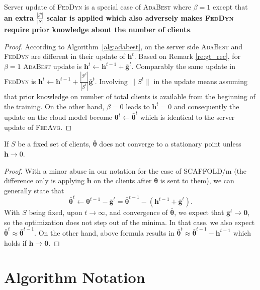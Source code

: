 \documentclass[runningheads]{llncs}
\def\algref#1{Algorithm~\ref{#1}}
\def\vtheta{{\bm{\theta}}}
\def\vzero{{\bm{0}}}
\def\vg{{\bm{g}}}
\def\vh{{\bm{h}}}
\def\gP{{\mathcal{P}}}
\newcommand*\mean[1]{\bar{#1}}
\newcommand{\fedavg}{\textsc{FedAvg}\xspace}
\newcommand{\scaffold}{\textsc{SCAFFOLD}\xspace}
\newcommand{\feddyn}{\textsc{FedDyn}\xspace}
\newcommand{\ours}{\textsc{AdaBest}\xspace}
\begin{document}
\begin{remark}
Server update of \feddyn is a special case of \ours where $\beta=1$ except that \textbf{an extra $\frac{|\gP|}{|S|}$ scalar is applied which also adversely makes \feddyn require prior knowledge about the number of clients}.

\begin{proof}
According to \algref{alg:adabest}, on the server side \ours and \feddyn are different in their update of $\vh^t$. Based on Remark \ref{re:gt_rec}, for $\beta=1$ \ours update is $\vh^t \leftarrow \vh^{t-1} + \mean{\vg}^t$. Comparably the same update in \feddyn is $\vh^t \leftarrow \vh^{t-1} + \frac{|\gP^t|}{|S^t|}\mean{\vg}^t$. Involving $\|S^t\|$ in the update means assuming that prior knowledge on number of total clients is available from the beginning of the training. On the other hand, $\beta=0$ leads to $\vh^t=0$ and consequently the update on the cloud model become $\vtheta^{t} \leftarrow \mean{\vtheta}^{t}$ which is identical to the server update of \fedavg.
\end{proof}

\end{remark}

\vspace{0.6cm}
\begin{theorem}
If $S$ be a fixed set of clients, $\mean{\vtheta}$ does not converge to a stationary point unless $\vh \rightarrow 0$.
\end{theorem}

\begin{proof}
With a minor abuse in our notation for the case of \scaffold/m (the difference only is applying $\vh$ on the clients after $\vtheta$ is sent to them), we can generally state that
\begin{equation*}
    \mean{\vtheta}^{t} \leftarrow \vtheta^{t-1} - \mean{\vg}^{t}= \mean{\vtheta}^{t-1} - (\vh^{t-1}+\mean{\vg}^t).
\end{equation*}
With $S$ being fixed, upon $t \rightarrow \infty$, and convergence of $\mean{\vtheta}$, we expect that $\vg^t \rightarrow \vzero$, so the optimization does not step out of the minima.
In that case. we also expect $\mean{\vtheta}^{t} \approx \mean{\vtheta}^{t-1}$. On the other hand, above formula results in $\mean{\vtheta}^{t} \approx \mean{\vtheta}^{t-1} - \vh^{t-1}$ which holds if $\vh \rightarrow \vzero$.
\end{proof}




\section{Algorithm Notation}
\end{document}
